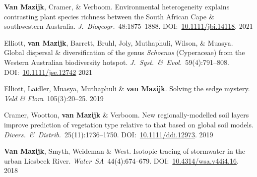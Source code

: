 \begin{hangparas}{2em}{1}

\textbf{Van Mazijk}, Cramer, \& Verboom.
Environmental heterogeneity explains contrasting plant species richness between
the South African Cape \& southwestern Australia.
\textit{J.~Biogeogr.}~48:1875--1888.
DOI:~\href{https://doi.org/10.1111/jbi.14118}{10.1111/jbi.14118}. \hfill 2021

Elliott, \textbf{van Mazijk}, Barrett, Bruhl,
Joly, Muthaphuli, Wilson, \& Muasya.
Global dispersal \& diversification of the genus \textit{Schoenus} (Cyperaceae)
from the Western Australian biodiversity hotspot.
\textit{J.~Syst.~\&~Evol.}~59(4):791--808.
DOI:~\href{https://doi.org/10.1111/jse.1274}{10.1111/jse.12742} \hfill 2021

Elliott, Laidler, Muasya, Muthaphuli \& \textbf{van Mazijk}.
Solving the sedge mystery.
\textit{Veld \& Flora}~105(3):20--25. \hfill 2019

Cramer, Wootton, \textbf{van Mazijk} \& Verboom.
New regionally-modelled soil layers improve prediction of vegetation type
relative to that based on global soil models.
\textit{Divers.~\&~Distrib.}~25(11):1736--1750.
DOI:~\href{https://doi.org/10.1111/ddi.12973}{10.1111/ddi.12973}. \hfill 2019

\textbf{Van Mazijk}, Smyth, Weideman \& West.
Isotopic tracing of stormwater in the urban Liesbeek River.
\textit{Water~SA}~44(4):674--679.
DOI:~\href{https://doi.org/10.4314/wsa.v44i4.16}{10.4314/wsa.v44i4.16}. \hfill 2018

\end{hangparas}
